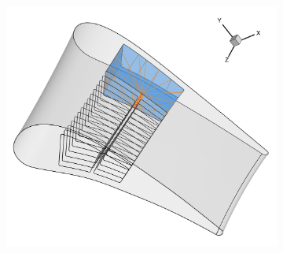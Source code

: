 \documentclass[8pt, aspectratio=169]{beamer}
\begin{document}
\begin{frame}
\begin{minipage}[t]{\textwidth}
\begin{figure}[H]
\begin{subfigure}{.32\textwidth}
				\includegraphics[width=\textwidth]{../../tec/channel/12.png}
				\vspace{1.2cm}
			\end{subfigure}
		\end{figure}
	\end{minipage}
	\vfill
\end{frame}
\end{document}
